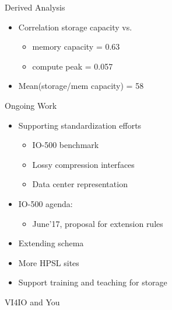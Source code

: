 \documentclass[portrait,a0paper,fontscale=0.4]{baposter}
\newcommand{\compresslist}{%
\setlength{\itemsep}{1pt}%
\setlength{\parskip}{0pt}%
\setlength{\parsep}{0pt}%
}
\begin{document}
\begin{poster}
\begin{posterbox}[name=awareness,column=3,below=engineering]{Derived Analysis}
\vspace*{-2em}
\begin{itemize}\compresslist
\item Correlation storage capacity vs.
  \begin{itemize}\compresslist
  \item memory capacity = 0.63
  \item compute peak = 0.057
  \end{itemize}
\item Mean(storage/mem capacity) = 58
\end{itemize}

\end{posterbox}

\begin{posterbox}[name=b4,column=3,below=awareness]{Ongoing Work}
\begin{itemize}\compresslist
\item Supporting standardization efforts
  \begin{itemize}\compresslist
  \item IO-500 benchmark
  \item Lossy compression interfaces
  \item Data center representation
  \end{itemize}
\item IO-500 agenda:
  \begin{itemize}
  \item June'17, proposal for extension rules
  \end{itemize}
\item Extending schema
\item More HPSL sites
\item Support training and teaching for storage
\end{itemize}
\end{posterbox}


\begin{posterbox}[name=hpccertification,column=3,below=b4, above=bottom]{VI4IO and You}


\end{posterbox}
\end{poster}
\end{document}
